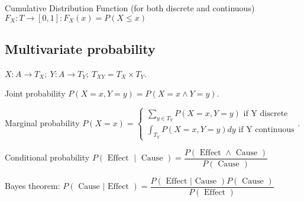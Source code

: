 \documentclass[]{article}
\begin{document}
	Cumulative Distribution Function (for both discrete and continuous) $F_X:T\to[0,1]: F_X(x) = P(X\le x)$
	
	\subsection{Multivariate probability}
	
	$X:A\to T_X; \ Y:A\to T_Y; \ T_{XY}=T_X \times T_Y$.
	
	Joint probability $P(X=x,Y=y) = P(X=x \land Y=y)$.
	
	Marginal probability $P(X=x)=\left\{\begin{matrix}
		\sum_{y\in T_Y} P(X=x,Y=y) \text{ if Y discrete}\\
		\int_{T_Y} P(X=x,Y=y) dy \text{ if Y continuous}
	\end{matrix}\right.$.
	
	Conditional probability $P(\text { Effect } \mid \text { Cause })=\dfrac{P(\text { Effect } \wedge \text { Cause })}{P(\text { Cause })}$
	
	Bayes theorem: $P(\text { Cause } | \text { Effect })=\dfrac{P(\text { Effect } | \text { Cause }) P( \text{ Cause })}{P(\text { Effect })}$
	
	\iffalse
	\subsection{Conditional independence}
	
	$$
	P \models (A \perp B) \hspace{1em} \Leftrightarrow \hspace{1em} P(A \mid B)=P(A) \hspace{1em} \Leftrightarrow \hspace{1em} P(B \mid A)=P(B) \hspace{1em} \Leftrightarrow \hspace{1em} P(A,B)=P(A)P(B)
	\newline
	$$$$
	P \models (A \perp B \mid C) \Leftrightarrow P(A|B,C) = P(A,C) \Leftrightarrow P(B|A,C) = P(B,C) \Leftrightarrow P(A,B|C) = P(A|C)P(B|C)
	$$
	\fi
	
	
\end{document}
